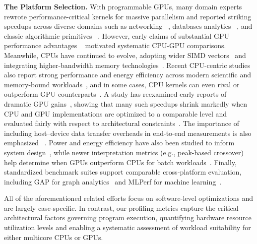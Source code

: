\noindent
\textbf{The Platform Selection.}
With programmable GPUs, many domain experts rewrote performance-critical kernels for massive parallelism and reported striking speedups across diverse domains such as networking ~\cite{gpu_network_1,gpu_network_2}, databases analytics ~\cite{gpu_db_1,gpu_db_2}, and classic algorithmic primitives ~\cite{gpu_algo_1,gpu_algo_2}. 
However, early claims of substantial GPU performance advantages ~\cite{gpuIsFast_che,gpuIsFast_ryoo} motivated systematic CPU-GPU comparisons. 
Meanwhile, CPUs have continued to evolve, adopting wider SIMD vectors~\cite{cpu_simd_1,cpu_simd_2} and integrating higher-bandwidth memory technologies~\cite{cpu_hbm_1,cpu_hbm_2}. 
Recent CPU-centric studies also report strong performance and energy efficiency across modern scientific and memory-bound workloads~\cite{cpu_perf_1}, and in some cases, CPU kernels can even rival or outperform GPU counterparts~\cite{cpu_over_gpu_1,cpu_over_gpu_2,cpu_over_gpu_3}.
A study has reexamined early reports of dramatic GPU gains~\cite{gpuIsFast_che,gpuIsFast_ryoo}, showing that many such speedups shrink markedly when CPU and GPU implementations are optimized to a comparable level and evaluated fairly with respect to architectural constraints~\cite{lee2010debunking}.
The importance of including host--device data transfer overheads in end-to-end measurements is also emphasized ~\cite{gregg2011transfer}. 
Power and energy efficiency have also been studied to inform system design~\cite{gpu_energy}, while newer interpretation metrics (e.g., peak-based crossover) help determine when GPUs outperform CPUs for batch workloads~\cite{peek_metrics2025}.
Finally, standardized benchmark suites support comparable cross-platform evaluation, including GAP for graph analytics~\cite{benchmark_gap,benchmark_gap_eval} and MLPerf for machine learning~\cite{benchmark_mlperf,benchmark_mlperfhpc}. 

All of the aforementioned related efforts focus on software-level optimizations and are largely case-specific. In contrast, our profiling metrics capture the critical architectural factors governing program execution, quantifying hardware resource utilization levels and enabling a systematic assessment of workload suitability for either multicore CPUs or GPUs.
